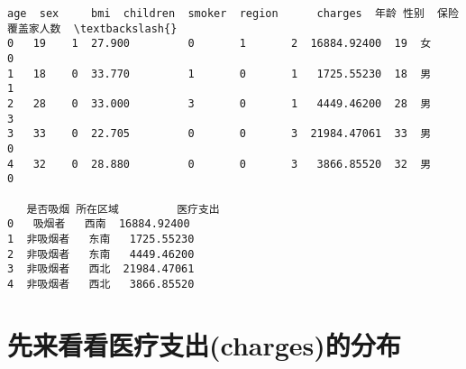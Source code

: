 \documentclass[11pt]{article}
\begin{document}
    \begin{Verbatim}[commandchars=\\\{\}]
   age  sex     bmi  children  smoker  region      charges  年龄 性别  保险覆盖家人数  \textbackslash{}
0   19    1  27.900         0       1       2  16884.92400  19  女        0   
1   18    0  33.770         1       0       1   1725.55230  18  男        1   
2   28    0  33.000         3       0       1   4449.46200  28  男        3   
3   33    0  22.705         0       0       3  21984.47061  33  男        0   
4   32    0  28.880         0       0       3   3866.85520  32  男        0   

   是否吸烟 所在区域         医疗支出  
0   吸烟者   西南  16884.92400  
1  非吸烟者   东南   1725.55230  
2  非吸烟者   东南   4449.46200  
3  非吸烟者   西北  21984.47061  
4  非吸烟者   西北   3866.85520  

    \end{Verbatim}

    \hypertarget{ux5148ux6765ux770bux770bux533bux7597ux652fux51fachargesux7684ux5206ux5e03}{%
\section{先来看看医疗支出(charges)的分布}\label{ux5148ux6765ux770bux770bux533bux7597ux652fux51fachargesux7684ux5206ux5e03}}
\end{document}
